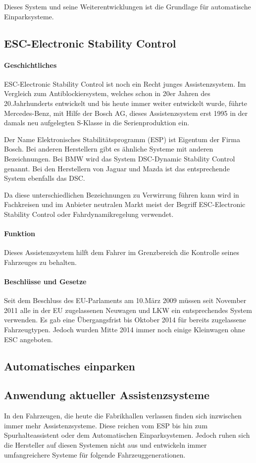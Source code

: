 Dieses System und seine Weiterentwicklungen ist die Grundlage für automatische Einparksysteme. 
\subsection{ESC-Electronic Stability Control} 
\paragraph{Geschichtliches} ESC-Electronic Stability Control ist noch ein Recht junges Assistenzsystem. Im Vergleich zum Antiblockiersystem, welches schon in 20er Jahren des 20.Jahrhunderts entwickelt und bis heute immer weiter entwickelt wurde, führte Mercedes-Benz, mit Hilfe der Bosch AG, dieses Assistenzsystem erst 1995 in der damals neu aufgelegten S-Klasse in die Serienproduktion ein. 

Der Name Elektronisches Stabilitätsprogramm (ESP) ist Eigentum der Firma Bosch. Bei anderen Herstellern gibt es ähnliche Systeme mit anderen Bezeichnungen. Bei BMW wird das System DSC-Dynamic Stability Control genannt. Bei den Herstellern von Jaguar und Mazda ist das entsprechende System ebenfalls das DSC.

Da diese unterschiedlichen Bezeichnungen zu Verwirrung führen kann wird in Fachkreisen und im Anbieter neutralen Markt meist der Begriff ESC-Electronic Stability Control oder Fahrdynamikregelung verwendet. 
\paragraph{Funktion}Dieses Assistenzsystem hilft dem Fahrer im Grenzbereich die Kontrolle seines Fahrzeuges zu behalten. 

\paragraph{Beschlüsse und Gesetze} Seit dem Beschluss des EU-Parlaments am 10.März 2009 müssen seit November 2011 alle in der EU zugelassenen Neuwagen und LKW ein entsprechendes System verwenden. Es gab eine Übergangsfrist bis Oktober 2014 für bereits zugelassene Fahrzeugtypen. Jedoch wurden Mitte 2014 immer noch einige Kleinwagen ohne ESC angeboten. 


\subsection{Automatisches einparken}

\subsection{Anwendung aktueller Assistenzsysteme}
In den Fahrzeugen, die heute die Fabrikhallen verlassen finden sich inzwischen immer mehr Assistenzsysteme. Diese reichen vom ESP bis hin zum Spurhalteassistent oder dem Automatischen Einparksystemen. Jedoch ruhen sich die Hersteller auf diesen Systemen nicht aus und entwickeln immer umfangreichere Systeme für folgende Fahrzeuggenerationen. 
